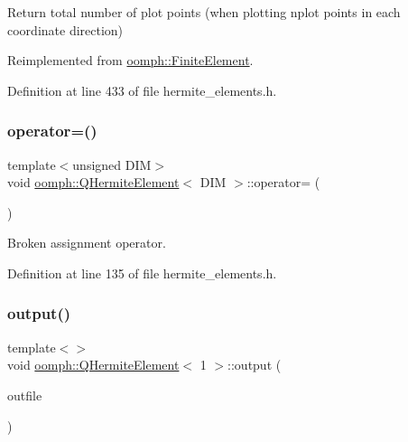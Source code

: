 Return total number of plot points (when plotting nplot points in each coordinate direction) 

Reimplemented from \hyperlink{classoomph_1_1FiniteElement_a8ed563c7ff0cfd8bafdbb0132b388106}{oomph\+::\+Finite\+Element}.



Definition at line 433 of file hermite\+\_\+elements.\+h.

\mbox{\label{classoomph_1_1QHermiteElement_a2c631218863046da393b0a137ccecee9}} 
\subsubsection{\texorpdfstring{operator=()}{operator=()}}
{\footnotesize\ttfamily template$<$unsigned D\+IM$>$ \\
void \hyperlink{classoomph_1_1QHermiteElement}{oomph\+::\+Q\+Hermite\+Element}$<$ D\+IM $>$\+::operator= (\begin{DoxyParamCaption}\item[{const \hyperlink{classoomph_1_1QHermiteElement}{Q\+Hermite\+Element}$<$ D\+IM $>$ \&}]{ }\end{DoxyParamCaption})\hspace{0.3cm}{\ttfamily [inline]}}



Broken assignment operator. 



Definition at line 135 of file hermite\+\_\+elements.\+h.

\mbox{\label{classoomph_1_1QHermiteElement_a07dd8f6d5fbb05e8b910b0d2e52a38aa}} 
\subsubsection{\texorpdfstring{output()}{output()}\hspace{0.1cm}{\footnotesize\ttfamily [1/12]}}
{\footnotesize\ttfamily template$<$$>$ \\
void \hyperlink{classoomph_1_1QHermiteElement}{oomph\+::\+Q\+Hermite\+Element}$<$ 1 $>$\+::output (\begin{DoxyParamCaption}\item[{std\+::ostream \&}]{outfile }\end{DoxyParamCaption})\hspace{0.3cm}{\ttfamily [virtual]}}



